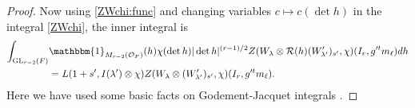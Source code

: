 \documentclass[12pt]{amsart}
\theoremstyle{remark}
\numberwithin{equation}{section}
\newcommand{\GL}{\mathrm{GL}}
\newcommand{\OO}{\mathcal{O}}
\theoremstyle{definition}
\newenvironment{psmatrix}
  {\left(\begin{smallmatrix}}
  {\end{smallmatrix}\right)}
\numberwithin{equation}{subsection}
\newcommand{\one}{\mathbbm{1}}
\begin{document}
\begin{proof}
Now using \eqref{ZWchi:func} and changing variables $c\mapsto c(\det h)$ in the integral \eqref{ZWchi}, the inner integral is
\begin{align*}
    \int_{\GL_{r-2}(F)}&\one_{M_{r-2}(\OO_F)}(h)\chi(\det h)|\det h|^{(r-1)/2}Z(W_\lambda\otimes \mathcal{R}(h)(W'_{\lambda'})_{s'},\chi)(I_{r},g'^tm_\ell)dh\\
    &=L(1+s',I(\lambda') \otimes \chi)Z(W_\lambda\otimes(W'_{\lambda'})_{s'},\chi)(I_r,g'^tm_\ell).
\end{align*}
Here we have used some basic facts on Godement-Jacquet integrals \cite[\S 1.6]{GodementJacquetBook}.  


\end{proof}
\end{document}

